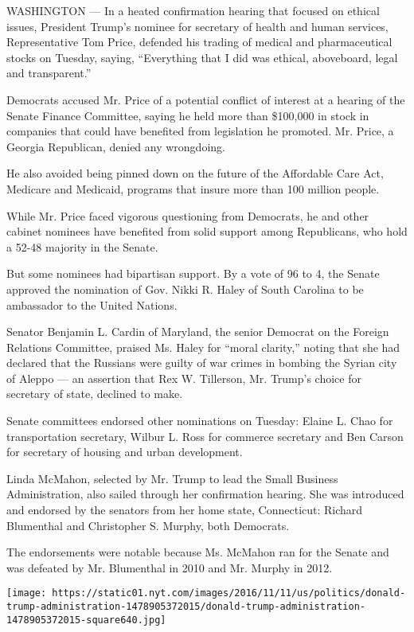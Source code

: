 WASHINGTON --- In a heated confirmation hearing that focused on ethical
issues, President Trump's nominee for secretary of health and human
services, Representative Tom Price, defended his trading of medical and
pharmaceutical stocks on Tuesday, saying, ``Everything that I did was
ethical, aboveboard, legal and transparent.''

Democrats accused Mr. Price of a potential conflict of interest at a
hearing of the Senate Finance Committee, saying he held more than
\$100,000 in stock in companies that could have benefited from
legislation he promoted. Mr. Price, a Georgia Republican, denied any
wrongdoing.

He also avoided being pinned down on the future of the Affordable Care
Act, Medicare and Medicaid, programs that insure more than 100 million
people.

While Mr. Price faced vigorous questioning from Democrats, he and other
cabinet nominees have benefited from solid support among Republicans,
who hold a 52-48 majority in the Senate.

But some nominees had bipartisan support. By a vote of 96 to 4, the
Senate approved the nomination of Gov. Nikki R. Haley of South Carolina
to be ambassador to the United Nations.

Senator Benjamin L. Cardin of Maryland, the senior Democrat on the
Foreign Relations Committee, praised Ms. Haley for ``moral clarity,''
noting that she had declared that the Russians were guilty of war crimes
in bombing the Syrian city of Aleppo --- an assertion that Rex W.
Tillerson, Mr. Trump's choice for secretary of state, declined to make.

Senate committees endorsed other nominations on Tuesday: Elaine L. Chao
for transportation secretary, Wilbur L. Ross for commerce secretary and
Ben Carson for secretary of housing and urban development.

Linda McMahon, selected by Mr. Trump to lead the Small Business
Administration, also sailed through her confirmation hearing. She was
introduced and endorsed by the senators from her home state,
Connecticut: Richard Blumenthal and Christopher S. Murphy, both
Democrats.

The endorsements were notable because Ms. McMahon ran for the Senate and
was defeated by Mr. Blumenthal in 2010 and Mr. Murphy in 2012.

\href{https://www.nytimes.com/interactive/2016/us/politics/donald-trump-administration.html}{}

\texttt{[image: https://static01.nyt.com/images/2016/11/11/us/politics/donald-trump-administration-1478905372015/donald-trump-administration-1478905372015-square640.jpg]}

